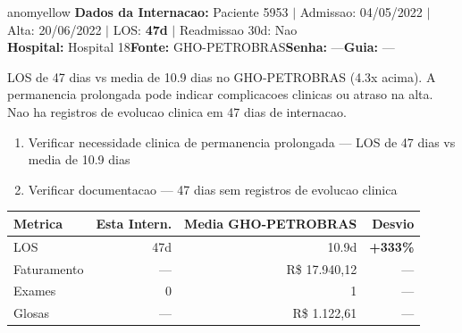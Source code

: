 \documentclass[a4paper,10pt]{article}
\begin{document}
\begin{anomalycard}[Internacao 5751 | GHO-PETROBRAS | MODERADO (z=2.04)]{anomyellow}
\textbf{Dados da Internacao:} Paciente 5953 $\mid$ Admissao: 04/05/2022 $\mid$ Alta: 20/06/2022 $\mid$ LOS: \textbf{47d} $\mid$ Readmissao 30d: Nao\\
\textbf{Hospital:} Hospital 18\quad\textbf{Fonte:} GHO-PETROBRAS\quad\textbf{Senha:} ---\quad\textbf{Guia:} ---\\
\vspace{2pt}\begin{tcolorbox}[colback=severityred!20,colframe=anomyellow,title={\textbf{Interpretacao de Negocio}},fonttitle=\bfseries\small,left=4pt,right=4pt,top=3pt,bottom=3pt]
{\small LOS de 47 dias vs media de 10.9 dias no GHO-PETROBRAS (4.3x acima). A permanencia prolongada pode indicar complicacoes clinicas ou atraso na alta. Nao ha registros de evolucao clinica em 47 dias de internacao.}
\end{tcolorbox}
\begin{tcolorbox}[colback=severityyellow!30,colframe=anomorange,title={\textbf{Recomendacoes Especificas}},fonttitle=\bfseries\small,left=4pt,right=4pt,top=3pt,bottom=3pt]
\begin{enumerate}[nosep,leftmargin=16pt]
\item {\small Verificar necessidade clinica de permanencia prolongada --- LOS de 47 dias vs media de 10.9 dias}
\item {\small Verificar documentacao --- 47 dias sem registros de evolucao clinica}
\end{enumerate}
\end{tcolorbox}
\begin{center}\begin{tabular}{l r r r}\toprule\textbf{Metrica} & \textbf{Esta Intern.} & \textbf{Media GHO-PETROBRAS} & \textbf{Desvio} \\\midrule
LOS & 47d & 10.9d & \textcolor{anomred}{\textbf{+333\%}} \\
Faturamento & --- & R\$ 17.940,12 & --- \\
Exames & 0 & 1 & --- \\
Glosas & --- & R\$ 1.122,61 & --- \\
\bottomrule\end{tabular}\end{center}


\end{anomalycard}
\end{document}
